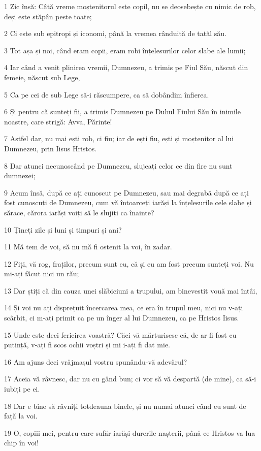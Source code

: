 \par 1 Zic însă: Câtă vreme moștenitorul este copil, nu se deosebește cu nimic de rob, deși este stăpân peste toate;
\par 2 Ci este sub epitropi și iconomi, până la vremea rânduită de tatăl său.
\par 3 Tot așa și noi, când eram copii, eram robi înțelesurilor celor slabe ale lumii;
\par 4 Iar când a venit plinirea vremii, Dumnezeu, a trimis pe Fiul Său, născut din femeie, născut sub Lege,
\par 5 Ca pe cei de sub Lege să-i răscumpere, ca să dobândim înfierea.
\par 6 Și pentru că sunteți fii, a trimis Dumnezeu pe Duhul Fiului Său în inimile noastre, care strigă: Avva, Părinte!
\par 7 Astfel dar, nu mai ești rob, ci fiu; iar de ești fiu, ești și moștenitor al lui Dumnezeu, prin Iisus Hristos.
\par 8 Dar atunci necunoscând pe Dumnezeu, slujeați celor ce din fire nu sunt dumnezei;
\par 9 Acum însă, după ce ați cunoscut pe Dumnezeu, sau mai degrabă după ce ați fost cunoscuți de Dumnezeu, cum vă întoarceți iarăși la înțelesurile cele slabe și sărace, cărora iarăși voiți să le slujiți ca înainte?
\par 10 Țineți zile și luni și timpuri și ani?
\par 11 Mă tem de voi, să nu mă fi ostenit la voi, în zadar.
\par 12 Fiți, vă rog, fraților, precum sunt eu, că și eu am fost precum sunteți voi. Nu mi-ați făcut nici un rău;
\par 13 Dar știți că din cauza unei slăbiciuni a trupului, am binevestit vouă mai întâi,
\par 14 Și voi nu ați disprețuit încercarea mea, ce era în trupul meu, nici nu v-ați scârbit, ci m-ați primit ca pe un înger al lui Dumnezeu, ca pe Hristos Iisus.
\par 15 Unde este deci fericirea voastră? Căci vă mărturisesc că, de ar fi fost cu putință, v-ați fi scos ochii voștri și mi i-ați fi dat mie.
\par 16 Am ajuns deci vrăjmașul vostru spunându-vă adevărul?
\par 17 Aceia vă râvnesc, dar nu cu gând bun; ci vor să vă despartă (de mine), ca să-i iubiți pe ei.
\par 18 Dar e bine să râvniți totdeauna binele, și nu numai atunci când eu sunt de față la voi.
\par 19 O, copiii mei, pentru care sufăr iarăși durerile nașterii, până ce Hristos va lua chip în voi!
